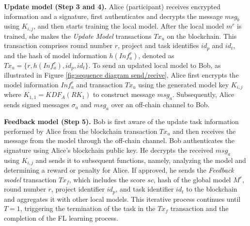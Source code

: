 \documentclass[a4paper,fleqn]{cas-dc}
\begin{document}
\noindent\textbf{Update model (Step 3 and 4).}
Alice (participant) receives encrypted information and a signature, first authenticates and decrypts the message $msg_{b}$ using $K_{i,j}$, and then starts training the local model.
After the local model $m^r$ is trained, she makes the \textit{Update Model} transactions $Tx_{u}$ on the blockchain.
This transaction comprises round number $r$, project and task identifies $id_{p}$ and $id_{t}$, and the hash of model information $h(Inf_{a}^{r})$, denoted as $Tx_{u} =\{r, h(Inf_{a}^{r}), id_{p}, id_{t}\}$.
To send an updated local model to Bob, as illustrated in Figure \ref{fig:sequence diagram send/recive}, Alice first encrypts the model information $Inf_{a}^{r}$ and transaction $Tx_{u}$ using the generated model key $K_{i,j}$ where $K_{1,1}=KDF_{A}(RK_{1})$ to construct message $msg_{a}$.
Subsequently, Alice sends signed messages $\sigma_{a}$ and $msg_{a}$ over an off-chain channel to Bob.

\noindent\textbf{Feedback model (Step 5).}
Bob is first aware of the update task information performed by Alice from the blockchain transaction $Tx_{u}$ and then receives the message from the model through the off-chain channel.
Bob authenticates the signature using Alice's blockchain public key.
He decrypts the received $msg_{a}$ using $K_{i,j}$ and sends it to subsequent functions, namely, analyzing the model and determining a reward or penalty for Alice.
If approved, he sends the \textit{Feedback model} transaction $Tx_{f}$, which includes the score $sc$, hash of the global model $M^r$, round number $r$, project identifier $id_{p}$, and task identifier $id_{t}$ to the blockchain and aggregates it with other local models.
This iterative process continues until $T=1$, triggering the termination of the task in the $Tx_{f}$ transaction and the completion of the FL learning process.
\end{document}
